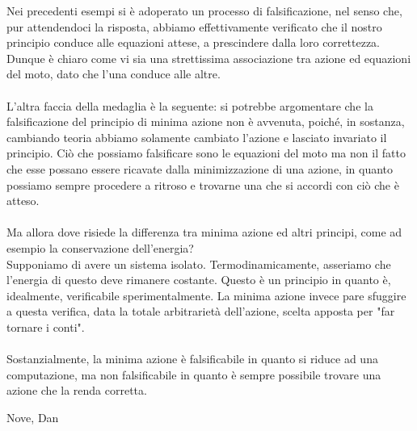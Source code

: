 \documentclass[]{article}
\begin{document}
	Nei precedenti esempi si è adoperato un processo di falsificazione, nel senso che, pur attendendoci la risposta, abbiamo effettivamente verificato che il nostro principio conduce alle equazioni attese, a prescindere dalla loro correttezza. Dunque è chiaro come vi sia una strettissima associazione tra azione ed equazioni del moto, dato che l'una conduce alle altre.\\
	\\
	L'altra faccia della medaglia è la seguente: si potrebbe argomentare che la falsificazione del principio di minima azione non è avvenuta, poiché, in sostanza, cambiando teoria abbiamo solamente cambiato l'azione e lasciato invariato il principio. Ciò che possiamo falsificare sono le equazioni del moto ma non il fatto che esse possano essere ricavate dalla minimizzazione di una azione, in quanto possiamo sempre procedere a ritroso e trovarne una che si accordi con ciò che è atteso.\\ 
	\\
	Ma allora dove risiede la differenza tra minima azione ed altri principi, come ad esempio la conservazione dell'energia?\\
	Supponiamo di avere un sistema isolato. Termodinamicamente, asseriamo che l'energia di questo deve rimanere costante. Questo è un principio in quanto è, idealmente, verificabile sperimentalmente. La minima azione invece pare sfuggire a questa verifica, data la totale arbitrarietà dell'azione, scelta apposta per "far tornare i conti".\\
	\\
	Sostanzialmente, la minima azione è falsificabile in quanto si riduce ad una computazione, ma non falsificabile in quanto è sempre possibile trovare una azione che la renda corretta.
	
	\bigskip 
	\begin{flushright}
		Nove, Dan
	\end{flushright}
\end{document}
